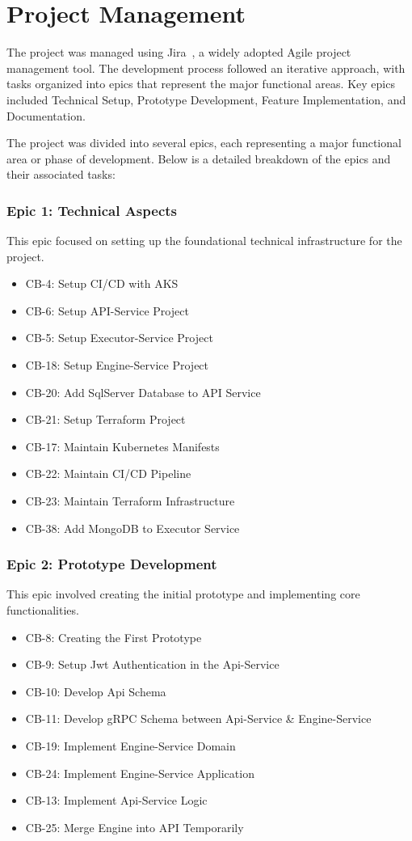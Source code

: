 \section{Project Management}
The project was managed using Jira~\cite{jira}, a widely adopted Agile project management tool. The development process followed an iterative approach, with tasks organized into epics that represent the major functional areas. Key epics included Technical Setup, Prototype Development, Feature Implementation, and Documentation.

The project was divided into several epics, each representing a major functional area or phase of development. Below is a detailed breakdown of the epics and their associated tasks:

\subsubsection{Epic 1: Technical Aspects}
This epic focused on setting up the foundational technical infrastructure for the project.
\begin{itemize}
    \item CB-4: Setup CI/CD with AKS
    \item CB-6: Setup API-Service Project
    \item CB-5: Setup Executor-Service Project
    \item CB-18: Setup Engine-Service Project
    \item CB-20: Add SqlServer Database to API Service
    \item CB-21: Setup Terraform Project
    \item CB-17: Maintain Kubernetes Manifests
    \item CB-22: Maintain CI/CD Pipeline
    \item CB-23: Maintain Terraform Infrastructure
    \item CB-38: Add MongoDB to Executor Service
\end{itemize}

\subsubsection{Epic 2: Prototype Development}
This epic involved creating the initial prototype and implementing core functionalities.
\begin{itemize}
    \item CB-8: Creating the First Prototype
    \item CB-9: Setup Jwt Authentication in the Api-Service
    \item CB-10: Develop Api Schema
    \item CB-11: Develop gRPC Schema between Api-Service \& Engine-Service
    \item CB-19: Implement Engine-Service Domain
    \item CB-24: Implement Engine-Service Application
    \item CB-13: Implement Api-Service Logic
    \item CB-25: Merge Engine into API Temporarily
\end{itemize}

